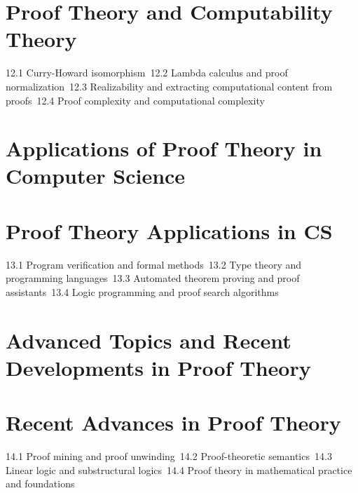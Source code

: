 \section{Proof Theory and Computability Theory}
12.1 Curry-Howard isomorphism\
12.2 Lambda calculus and proof normalization\
12.3 Realizability and extracting computational content from proofs\
12.4 Proof complexity and computational complexity\
\section{Applications of Proof Theory in Computer Science}
\section{Proof Theory Applications in CS}
13.1 Program verification and formal methods\
13.2 Type theory and programming languages\
13.3 Automated theorem proving and proof assistants\
13.4 Logic programming and proof search algorithms\
\section{Advanced Topics and Recent Developments in Proof Theory}
\section{Recent Advances in Proof Theory}
14.1 Proof mining and proof unwinding\
14.2 Proof-theoretic semantics\
14.3 Linear logic and substructural logics\
14.4 Proof theory in mathematical practice and foundations\
